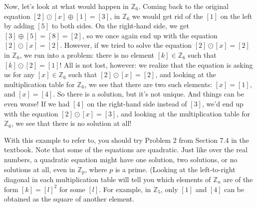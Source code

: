 \documentclass[letterpaper,12pt]{article}
\newcommand{\Z}{\mathbb{Z}}
\begin{document}
Now, let's look at what would happen in $\Z_6$. Coming back to the original equation $[2]\odot [x] \oplus [1] = [3]$, in $\Z_6$ we would get rid of the $[1]$ on the left by adding $[5]$ to both sides. On the right-hand side, we get $[3]\oplus [5] = [8] = [2]$, so we once again end up with the equation $[2]\odot [x] = [2]$.
However, if we tried to solve the equation $[2]\odot [x] = [2]$ in $\Z_6$, we run into a problem: there is no element $[k]\in \Z_6$ such that 
$[k]\odot [2] = [1]$! All is not lost, however: we realize that the equation is asking us for any $[x]\in\Z_6$ such that $[2]\odot [x] = [2]$, and looking at the multiplication table for $\Z_6$, we see that there are two such elements: $[x]=[1]$, and $[x]=[4]$. So there is a solution, but it's not unique. And things can be even worse! If we had $[4]$ on the right-hand side instead of $[3]$, we'd end up with the equation $[2]\odot [x] = [3]$, and looking at the multiplication table for $\Z_6$, we see that there is no solution at all!  

With this example to refer to, you should try Problem 2 from Section 7.4 in the textbook. Note that some of the equations are quadratic. Just like over the real numbers, a quadratic equation might have one solution, two solutions, or no solutions at all, even in $\Z_p$, where $p$ is a prime. (Looking at the left-to-right diagonal in each multiplication table will tell you which elements of $\Z_n$ are of the form $[k] = [l]^2$ for some $[l]$. For example, in $\Z_5$, only $[1]$ and $[4]$ can be obtained as the square of another element.
\end{document}
